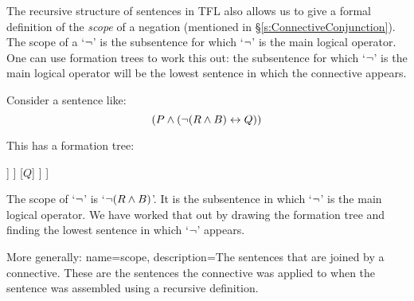 The recursive structure of sentences in TFL also allows us to give a formal definition of the \emph{scope} of a negation (mentioned in \S\ref{s:ConnectiveConjunction}). The scope of a `$\neg$' is the subsentence for which `$\neg$' is the main logical operator. One can use formation trees to work this out: the subsentence for which  `$\neg$' is the main logical operator will be the lowest sentence in which the connective appears. 

Consider a sentence like:
$$(P \wedge (\neg (R \wedge B) \leftrightarrow Q))$$ 

This has a formation tree: 

\begin{center}
	\begin{forest}
[$(P \eand (\enot (R \eand B) \eiff Q))$
	[$P$]
	[$(\enot (R \eand B) \eiff Q))$
		[$\enot (R \eand B)$
			[$(R\eand B)$
				[$R$]
				[$B$]
			]
		]
		[$Q$]
	]
]
\end{forest}
\end{center}

The scope of `$\neg$' is `$\enot (R \eand B)$'. It is the subsentence in which `$\neg$' is the main logical operator. We have worked that out by drawing the formation tree and finding the lowest sentence in which `$\neg$' appears. 


More generally:
{
name=scope,
description={The sentences that are joined by a connective. These are the sentences the connective was applied to when the sentence was assembled using a recursive definition.}
}

%
%
%
% 
%

